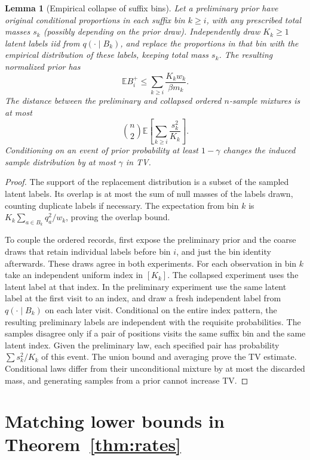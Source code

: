 \documentclass[11pt]{article}
\newtheorem{lemma}[theorem]{Lemma}
\newcommand{\E}{\mathbb{E}}
\begin{document}
\begin{lemma}[Empirical collapse of suffix bins]\label{lem:collapse}
Let a preliminary prior have original conditional proportions in each suffix bin \(k\ge i\), with any prescribed total masses \(s_k\) (possibly depending on the prior draw). Independently draw \(K_k\ge1\) latent labels iid from \(q(\cdot\mid B_k)\), and replace the proportions in that bin with the empirical distribution of these labels, keeping total mass \(s_k\). The resulting normalized prior has
\[
  \E B_i^+\le\sum_{k\ge i}\frac{K_k w_k}{\beta m_k}.
\]
The distance between the preliminary and collapsed ordered \(n\)-sample mixtures is at most
\[
 \binom n2\E\!\left[\sum_{k\ge i}\frac{s_k^2}{K_k}\right].
\]
Conditioning on an event of prior probability at least \(1-\gamma\) changes the induced sample distribution by at most \(\gamma\) in TV.
\end{lemma}

\begin{proof}
The support of the replacement distribution is a subset of the sampled latent labels. Its overlap is at most the sum of null masses of the labels drawn, counting duplicate labels if necessary. The expectation from bin \(k\) is \(K_k\sum_{a\in B_k}q_a^2/w_k\), proving the overlap bound.

To couple the ordered records, first expose the preliminary prior and the coarse draws that retain individual labels before bin \(i\), and just the bin identity afterwards. These draws agree in both experiments. For each observation in bin \(k\) take an independent uniform index in \([K_k]\). The collapsed experiment uses the latent label at that index. In the preliminary experiment use the same latent label at the first visit to an index, and draw a fresh independent label from \(q(\cdot\mid B_k)\) on each later visit. Conditional on the entire index pattern, the resulting preliminary labels are independent with the requisite probabilities. The samples disagree only if a pair of positions visits the same suffix bin and the same latent index. Given the preliminary law, each specified pair has probability \(\sum s_k^2/K_k\) of this event. The union bound and averaging prove the TV estimate. Conditional laws differ from their unconditional mixture by at most the discarded mass, and generating samples from a prior cannot increase TV.
\end{proof}

\section{Matching lower bounds in Theorem~\ref{thm:rates}}
\end{document}
